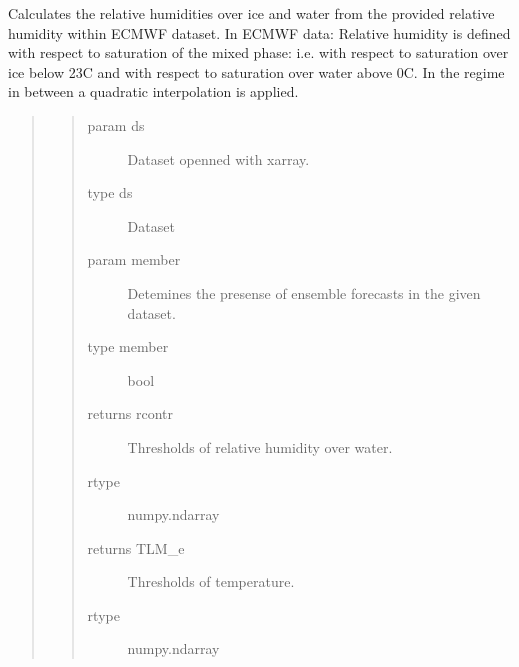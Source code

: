 \documentclass[a4paper,11pt,english]{sphinxmanual}
\begin{document}
\begin{fulllineitems}
\label{\detokenize{envlib:envlib.contrail.get_relative_hum}}
Calculates the relative humidities over ice and water from the provided relative humidity within ECMWF
dataset. In ECMWF data: Relative humidity is defined with respect to saturation of the mixed phase: i.e. with
respect to saturation over ice below \sphinxhyphen{}23C and with respect to saturation over water above 0C. In the regime in
between a quadratic interpolation is applied.
\begin{quote}
\begin{quote}\begin{description}
\item[{param ds}] \leavevmode
Dataset openned with xarray.

\item[{type ds}] \leavevmode
Dataset

\item[{param member}] \leavevmode
Detemines the presense of ensemble forecasts in the given dataset.

\item[{type member}] \leavevmode
bool

\item[{returns rcontr}] \leavevmode
Thresholds of relative humidity over water.

\item[{rtype}] \leavevmode
numpy.ndarray

\item[{returns TLM\_e}] \leavevmode
Thresholds of temperature.

\item[{rtype}] \leavevmode
numpy.ndarray

\end{description}\end{quote}
\end{quote}

\end{fulllineitems}

\end{document}
